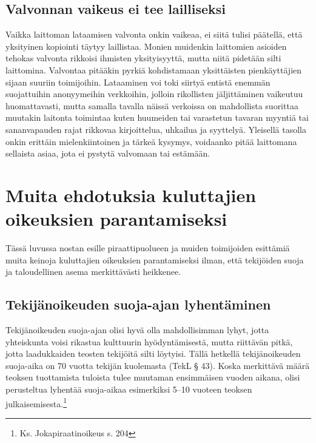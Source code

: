 \documentclass[titlepage,12pt]{article}
\begin{document}


\subsection{Valvonnan vaikeus ei tee lailliseksi}

Vaikka laittoman lataamisen valvonta onkin vaikeaa, ei siitä tulisi
päätellä, että yksityinen kopiointi täytyy laillistaa.  Monien
muidenkin laittomien asioiden tehokas valvonta rikkoisi ihmisten
yksityisyyttä, mutta niitä pidetään silti laittomina.  Valvontaa
pitääkin pyrkiä kohdistamaan yksittäisten pienkäyttäjien sijaan
suuriin toimijoihin.  Lataaminen voi toki siirtyä entistä enemmän
suojattuihin anonyymeihin verkkoihin, jolloin rikollisten
jäljittäminen vaikeutuu huomattavasti, mutta samalla tavalla näissä
verkoissa on mahdollista suorittaa muutakin laitonta toimintaa kuten
huumeiden tai varastetun tavaran myyntiä tai sananvapauden rajat
rikkovaa kirjoittelua, uhkailua ja syyttelyä.  Yleisellä tasolla onkin
erittäin mielenkiintoinen ja tärkeä kysymys, voidaanko pitää
laittomana sellaista asiaa, jota ei pystytä valvomaan tai estämään.


\section{Muita ehdotuksia kuluttajien oikeuksien parantamiseksi}

Tässä luvussa nostan esille piraattipuolueen ja muiden toimijoiden
esittämiä muita keinoja kuluttajien oikeuksien parantamiseksi ilman,
että tekijöiden suoja ja taloudellinen asema merkittävästi heikkenee.

\subsection{Tekijänoikeuden suoja-ajan lyhentäminen}

Tekijänoikeuden suoja-ajan olisi hyvä olla mahdollisimman lyhyt, jotta
yhteiskunta voisi rikastua kulttuurin hyödyntämisestä, mutta riittävän
pitkä, jotta laadukkaiden teosten tekijöitä silti löytyisi.  Tällä
hetkellä tekijänoikeuden suoja-aika on 70 vuotta tekijän kuolemasta
(TekL § 43).  Koska merkittävä määrä teoksen tuottamista tuloista
tulee muutaman ensimmäisen vuoden aikana, olisi perusteltua lyhentää
suoja-aikaa esimerkiksi 5--10 vuoteen teoksen
julkaisemisesta.\footnote{Ks. Jokapiraatinoikeus s. 204}
\end{document}
